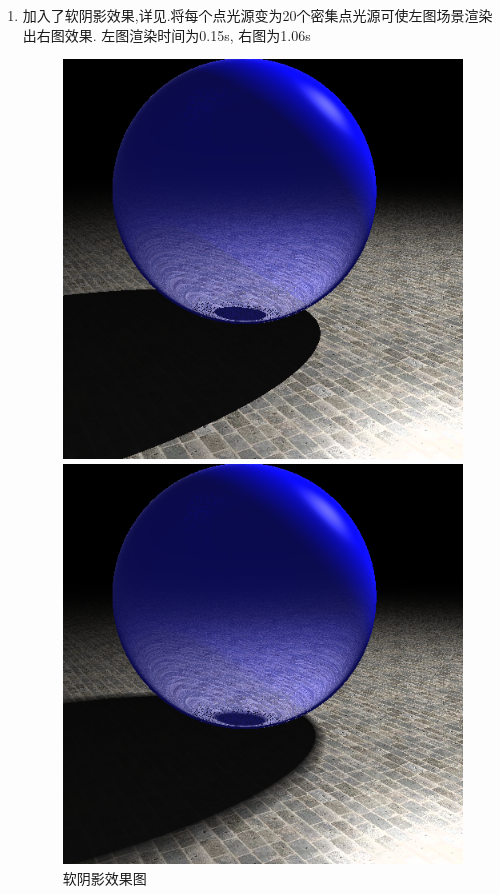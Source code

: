 \begin{enumerate}
  \item 加入了软阴影效果,详见.将每个点光源变为20个密集点光源可使左图场景渲染出右图效果.
    左图渲染时间为0.15s, 右图为1.06s
    \begin{figure}[H]
      \begin{minipage}[b]{0.46\linewidth}
        \centering
        \includegraphics[width=\textwidth]{img/no_soft.png}
      \end{minipage}
      \begin{minipage}[b]{0.46\linewidth}
        \centering
        \includegraphics[width=\textwidth]{img/soft.png}
      \end{minipage}
      \caption{软阴影效果图\label{fig:soft}}
    \end{figure}


\end{enumerate}

